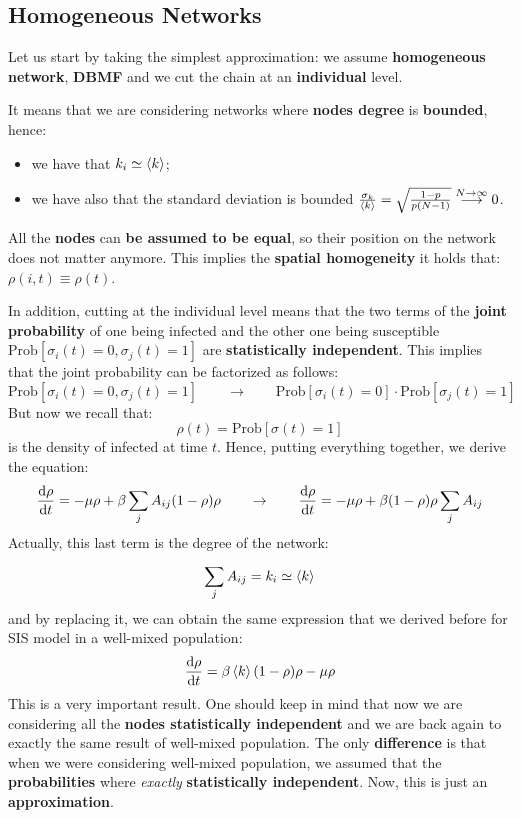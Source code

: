\documentclass[../main/main.tex]{subfiles}
\begin{document}
\subsection{Homogeneous Networks}
Let us start by taking the simplest approximation: we assume \textbf{homogeneous network}, \textbf{DBMF} and we cut the chain at an \textbf{individual} level.

It means that we are considering networks where \textbf{nodes degree} is \textbf{bounded}, hence:
\begin{itemize}
\item we have that \( k_i \simeq \expval{k}  \);
\item we have also that the standard deviation is bounded \( \frac{\sigma _k}{\expval{k} } = \sqrt{ \frac{1-p}{p(N-1)} } \overset{N \rightarrow \infty }{\longrightarrow} 0\).
\end{itemize}
All the \textbf{nodes} can \textbf{be assumed to be equal}, so their position on the network does not matter anymore. This implies the \textbf{spatial homogeneity} it holds that: \( \rho (i,t) \equiv \rho (t) \).

In addition, cutting at the individual level means that the two terms of the \textbf{joint probability} of one being infected and the other one being susceptible \( \text{Prob} [\sigma _i (t) = 0, \sigma _j (t ) =1 ] \) are \textbf{statistically independent}. This implies that the joint probability can be factorized as follows:
\begin{equation*}
  \text{Prob} [\sigma _i (t) = 0, \sigma _j (t ) =1 ] \qquad \rightarrow \qquad \text{Prob} [\sigma _i (t) = 0] \cdot \text{Prob} [\sigma _j (t ) =1 ]
\end{equation*}
But now we recall that:
\begin{equation*}
  \rho (t) = \text{Prob} [\sigma (t)=1]
\end{equation*}
is the density of infected at time \( t \).
Hence, putting everything together, we derive the equation:
\begin{equation*}
  \dv{\rho }{t} = - \mu \rho  + \beta \sum_{j}^{} A_{ij} (1- \rho ) \rho \qquad \rightarrow \qquad
   \dv{\rho }{t} = - \mu \rho  + \beta (1- \rho ) \rho \sum_{j}^{} A_{ij}
\end{equation*}
Actually, this last term is the degree of the network:
\begin{equation}
  \sum_{j}^{} A_{ij} = k_i \simeq \expval{k}
\end{equation}
and by replacing it, we can obtain the same expression that we derived before for SIS model in a well-mixed population:
\begin{equation}
  \dv{\rho }{t} = \beta \expval{k} (1- \rho ) \rho - \mu \rho
\end{equation}
This is a very important result.
One should keep in mind that now we are considering all the \textbf{nodes statistically independent} and we are back again to exactly the same result of well-mixed population. The only \textbf{difference} is that when we were considering well-mixed population, we assumed that the \textbf{probabilities} where \emph{exactly} \textbf{statistically independent}. Now, this is just an \textbf{approximation}.
\end{document}
